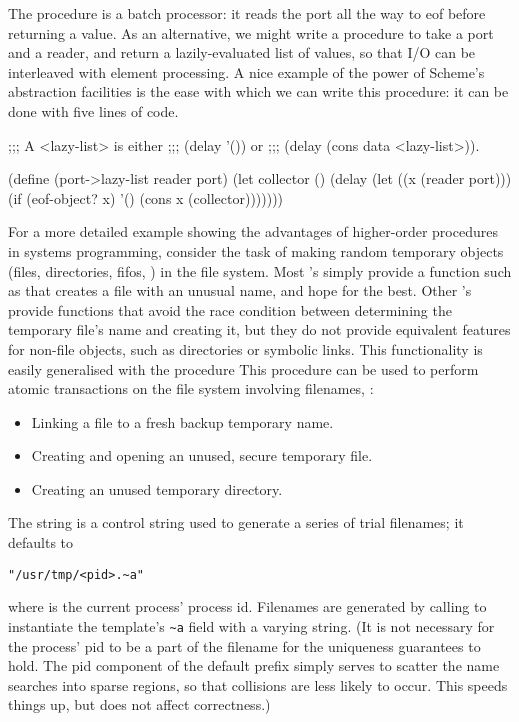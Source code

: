 The  procedure is a batch processor:
it reads the port all the way to eof before returning a value.
As an alternative, we might write a procedure to take a port and a reader,
and return a lazily-evaluated list of values,
so that I/O can be interleaved with element processing.
A nice example of the power of Scheme's abstraction facilities is the
ease with which we can write this procedure:
it can be done with five lines of code.
\begin{code}
;;; A <lazy-list> is either 
;;;     (delay '()) or
;;;     (delay (cons data <lazy-list>)).

(define (port->lazy-list reader port)
  (let collector ()
    (delay (let ((x (reader port)))
             (if (eof-object? x) '()
                 (cons x (collector)))))))\end{code}

For a more detailed example showing the advantages of higher-order procedures
in {\Unix} systems programming, consider the task of making random temporary
objects (files, directories, fifos, \etc) in the file system.
Most {\Unix}'s simply provide a function such as  that creates a
file with an unusual name, and hope for the best.
Other {\Unix}'s provide functions that avoid the race condition between
determining the temporary file's name and creating it, but they do not
provide equivalent features for non-file objects, such as directories or
symbolic links.
\pagebreak
This functionality is easily generalised with the procedure
This procedure can be used to perform atomic transactions on
the file system involving filenames, \eg:
\begin{itemize}
\item Linking a file to a fresh backup temporary name.
\item Creating and opening an unused, secure temporary file.
\item Creating an unused temporary directory.%
\end{itemize}
%
The string  is a  control string used to generate
a series of trial filenames; it defaults to
%
\begin{tightinset}\verb|"/usr/tmp/<pid>.~a"|\end{tightinset}\ignorespaces
%
where  is the current process' process id.
Filenames are generated by calling  to instantiate the 
template's \verb|~a| field with a varying string.
    (It is not necessary for the process' pid to be a part of the filename
    for the uniqueness guarantees to hold. The pid component of the default
    prefix simply serves to scatter the name searches into sparse regions, so
    that collisions are less likely to occur. This speeds things up, but does
    not affect correctness.)

